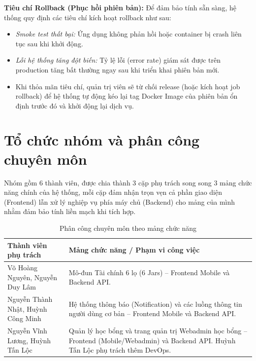 \textbf{Tiêu chí Rollback (Phục hồi phiên bản):} Để đảm bảo tính sẵn sàng, hệ thống quy định các tiêu chí kích hoạt rollback như sau:
\begin{itemize}
    \item \textit{Smoke test thất bại:} Ứng dụng không phản hồi hoặc container bị crash liên tục sau khi khởi động.
    \item \textit{Lỗi hệ thống tăng đột biến:} Tỷ lệ lỗi (error rate) giám sát được trên production tăng bất thường ngay sau khi triển khai phiên bản mới.
    \item Khi thỏa mãn tiêu chí, quản trị viên sẽ từ chối release (hoặc kích hoạt job rollback) để hệ thống tự động kéo lại tag Docker Image của phiên bản ổn định trước đó và khởi động lại dịch vụ.
\end{itemize}

\section{Tổ chức nhóm và phân công chuyên môn}
Nhóm gồm 6 thành viên, được chia thành 3 cặp phụ trách song song 3 mảng chức năng chính của hệ thống, mỗi cặp đảm nhận trọn vẹn cả phần giao diện (Frontend) lẫn xử lý nghiệp vụ phía máy chủ (Backend) cho mảng của mình nhằm đảm bảo tính liền mạch khi tích hợp. 

\begin{table}[H]
    \centering
    \begin{tabular}{|L{5cm}|L{9cm}|}
        \hline
        \textbf{Thành viên phụ trách} & \textbf{Mảng chức năng / Phạm vi công việc} \\
        \hline
        Võ Hoàng Nguyên, Nguyễn Duy Lâm & Mô-đun Tài chính 6 lọ (6 Jars) -- Frontend Mobile và Backend API. \\ \hline
        Nguyễn Thành Nhật, Huỳnh Công Minh & Hệ thống thông báo (Notification) và các luồng thông tin người dùng cơ bản -- Frontend Mobile và Backend API. \\ \hline
        Nguyễn Vĩnh Lương, Huỳnh Tấn Lộc & Quản lý học bổng và trang quản trị Webadmin học bổng -- Frontend (Mobile/Webadmin) và Backend API. Huỳnh Tấn Lộc phụ trách thêm DevOps. \\
        \hline
    \end{tabular}

    \caption{Phân công chuyên môn theo mảng chức năng}
    \label{tab:phan-cong}
\end{table}

